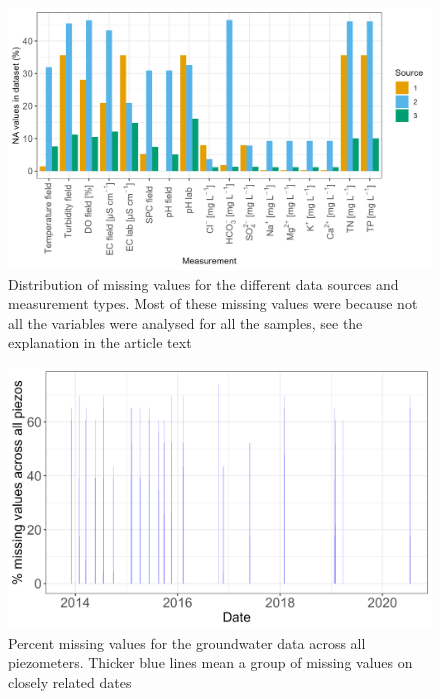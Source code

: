 \documentclass[, manuscript]{copernicus}
\begin{document}
\begin{figure}
\includegraphics[width=0.9\linewidth]{Figures/na_count} \caption{Distribution of missing values for the different data sources and measurement types. Most of these missing values were because not all the variables were analysed for all the samples, see the explanation in the article text}\label{fig:na-plot}
\end{figure}

\clearpage

\begin{figure}
\includegraphics[width=0.9\linewidth]{Figures/na_GW} \caption{Percent missing values for the groundwater data across all piezometers. Thicker blue lines mean a group of missing values on closely related dates}\label{fig:gw-na-plot}
\end{figure}
\end{document}
